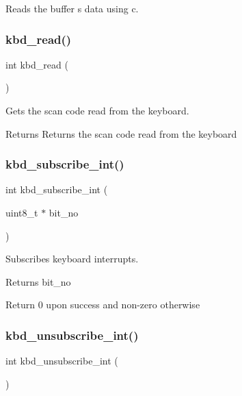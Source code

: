 Reads the buffer s data using c. 

\mbox{\label{group__keyboard_ga285ec963b858023390824480d3c5c531}} 
\subsubsection{\texorpdfstring{kbd\_read()}{kbd\_read()}}
{\footnotesize\ttfamily int kbd\+\_\+read (\begin{DoxyParamCaption}{ }\end{DoxyParamCaption})}



Gets the scan code read from the keyboard. 

\begin{DoxyReturn}{Returns}
Returns the scan code read from the keyboard 
\end{DoxyReturn}
\mbox{\label{group__keyboard_gaa7a491d4d95eab5ca5326c4000ad67f8}} 
\subsubsection{\texorpdfstring{kbd\_subscribe\_int()}{kbd\_subscribe\_int()}}
{\footnotesize\ttfamily int kbd\+\_\+subscribe\+\_\+int (\begin{DoxyParamCaption}\item[{uint8\+\_\+t $\ast$}]{bit\+\_\+no }\end{DoxyParamCaption})}



Subscribes keyboard interrupts. 

\begin{DoxyReturn}{Returns}
bit\+\_\+no 

Return 0 upon success and non-\/zero otherwise 
\end{DoxyReturn}
\mbox{\label{group__keyboard_ga5bdf6cfb570c375192b0d87913b65c57}} 
\subsubsection{\texorpdfstring{kbd\_unsubscribe\_int()}{kbd\_unsubscribe\_int()}}
{\footnotesize\ttfamily int kbd\+\_\+unsubscribe\+\_\+int (\begin{DoxyParamCaption}{ }\end{DoxyParamCaption})}



